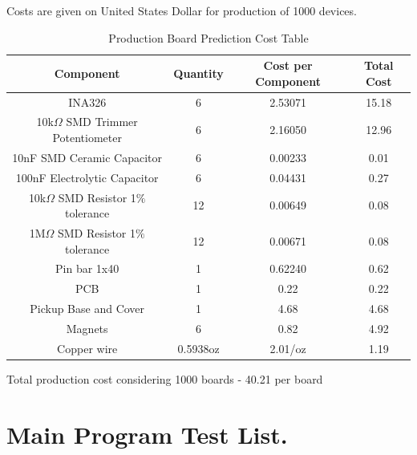 Costs are given on United States Dollar for production of 1000 devices.\\
\begin{table}[htb]
  \begin{center}
    \ABNTEXreducedfont
    \caption[Production Board Prediction Cost Table]{Production Board Prediction Cost Table}
    \label{Production-cost}
    \begin{tabular}{c|c|c|c}
      \textbf{Component} & \textbf{Quantity} & \textbf{Cost per Component} & \textbf{Total Cost} \\
     \hline
     \hline
    INA326 & 6 & 2.53071 & 15.18\\ \hline
    10k$\Omega$ SMD Trimmer Potentiometer & 6 & 2.16050 & 12.96 \\ \hline
    10nF SMD Ceramic Capacitor & 6 & 0.00233 & 0.01 \\ \hline
    100nF Electrolytic Capacitor & 6 & 0.04431 & 0.27 \\ \hline
    10k$\Omega$ SMD Resistor 1$\%$ tolerance & 12 & 0.00649 & 0.08 \\ \hline
    1M$\Omega$ SMD Resistor 1$\%$ tolerance & 12 & 0.00671 & 0.08 \\ \hline
    Pin bar 1x40 & 1 & 0.62240 & 0.62 \\ \hline
    PCB & 1 & 0.22 & 0.22 \\ \hline
    Pickup Base and Cover & 1 & 4.68 & 4.68 \\ \hline
    Magnets & 6 & 0.82 & 4.92  \\ \hline
    Copper wire & 0.5938oz & 2.01/oz & 1.19  \\ \hline
  \end{tabular}
\end{center}
\end{table}

Total production cost considering 1000 boards - 40.21 per board

\chapter{Main Program Test List.}
\label{test-list}

